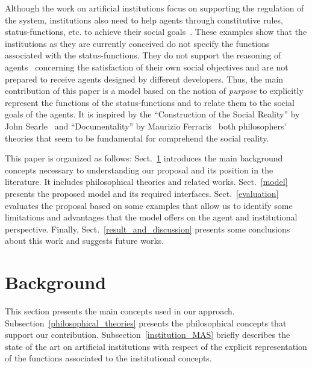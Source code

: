 \documentclass[runningheads]{llncs}
\begin{document}
Although the work on artificial institutions focus on supporting the regulation of the system, institutions also need to help agents through constitutive rules, status-functions, etc. to achieve their social goals~\cite{rodriguez2015towards}.
These examples show that the institutions as they are currently conceived do not specify the functions associated with the status-functions.  
They do not support the reasoning of agents~\cite{rodriguez2015towards} concerning the satisfaction of their own social objectives and are not prepared to receive agents designed by different developers. Thus, the main contribution of this paper is a model based on the notion of \emph{purpose} to explicitly represent the functions of the status-functions and to relate them to the social goals of the agents. 
It is inspired by the ``Construction of the Social Reality'' by John Searle~\cite{searle1995construction,searle2010making} and ``Documentality'' by Maurizio Ferraris~\cite{condello2019money} both philosophers' theories that seem to be fundamental for comprehend the social reality.

This paper is organized as follows: Sect.~\ref{background} introduces the main background concepts necessary to understanding our proposal and its position in the literature. It includes philosophical theories and related works. 
Sect.~\ref{model} presents the proposed model and its required interfaces. Sect.~\ref{evaluation} evaluates the proposal based on some examples that allow us to identify some limitations and advantages that the model offers on the agent and institutional perspective. Finally, Sect.~\ref{result_and_discussion} presents some conclusions about this work and suggests future works.


\section{Background}
\label{background}


This section presents the main concepts used in our approach.
Subsection~\ref{philosophical_theories} presents the philosophical concepts that support our contribution. Subsection~\ref{institution_MAS} briefly describes the state of the art on artificial institutions with respect of the explicit representation of the functions associated to the institutional concepts.

\end{document}
